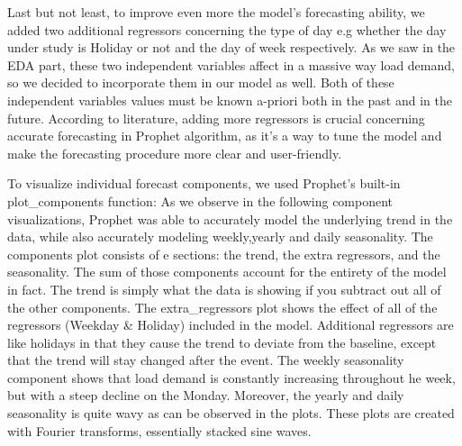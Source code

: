 Last but not least, to improve even more the model's forecasting ability, we added two additional regressors concerning the type of day e.g whether the day under study is Holiday or not and the day of week respectively. As we saw in the EDA part, these two independent variables affect in a massive way load demand, so we decided to incorporate them in our model as well. Both of these independent variables values must be known a-priori both in the past and in the future. According to literature, adding more regressors is crucial concerning accurate forecasting in Prophet algorithm, as it's a way to tune the model and make the forecasting procedure more clear and user-friendly.
\par To visualize individual forecast components, we used Prophet’s built-in plot\_components function: As we observe in the following component visualizations, Prophet was able to accurately model the underlying trend in the data, while also accurately modeling weekly,yearly and daily seasonality. The components plot consists of e sections: the trend, the extra regressors, and the seasonality. The sum of those components account for the entirety of the model in fact. The trend is simply what the data is showing if you subtract out all of the other components. The extra\_regressors plot shows the effect of all of the regressors (Weekday \& Holiday) included in the model. Additional regressors are like holidays in that they cause the trend to deviate from the baseline, except that the trend will stay changed after the event. The weekly seasonality component shows that load demand is constantly increasing throughout he week, but with a steep decline on the Monday. Moreover, the yearly and daily seasonality is quite wavy as can be observed in the plots. These plots are created with Fourier transforms, essentially stacked sine waves.
